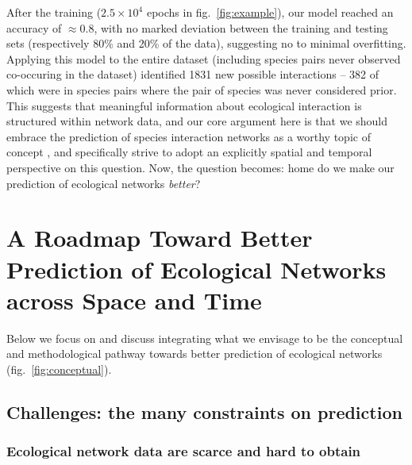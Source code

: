 \documentclass[10pt,oneside]{article}
\begin{document}
After the training (\(2.5\times 10^4\) epochs in
fig.~\ref{fig:example}), our model reached an accuracy of
\(\approx 0.8\), with no marked deviation between the training and
testing sets (respectively 80\% and 20\% of the data), suggesting no to
minimal overfitting. Applying this model to the entire dataset
(including species pairs never observed co-occuring in the dataset)
identified 1831 new possible interactions -- 382 of which were in
species pairs where the pair of species was never considered prior. This
suggests that meaningful information about ecological interaction is
structured within network data, and our core argument here is that we
should embrace the prediction of species interaction networks as a
worthy topic of concept , and specifically strive to adopt an explicitly
spatial and temporal perspective on this question. Now, the question
becomes: home do we make our prediction of ecological networks
\emph{better}?

\hypertarget{a-roadmap-toward-better-prediction-of-ecological-networks-across-space-and-time}{%
\section{A Roadmap Toward Better Prediction of Ecological Networks
across Space and
Time}\label{a-roadmap-toward-better-prediction-of-ecological-networks-across-space-and-time}}

Below we focus on and discuss integrating what we envisage to be the
conceptual and methodological pathway towards better prediction of
ecological networks (fig.~\ref{fig:conceptual}).

\hypertarget{challenges-the-many-constraints-on-prediction}{%
\subsection{Challenges: the many constraints on
prediction}\label{challenges-the-many-constraints-on-prediction}}

\hypertarget{ecological-network-data-are-scarce-and-hard-to-obtain}{%
\subsubsection{Ecological network data are scarce and hard to
obtain}\label{ecological-network-data-are-scarce-and-hard-to-obtain}}
\end{document}
